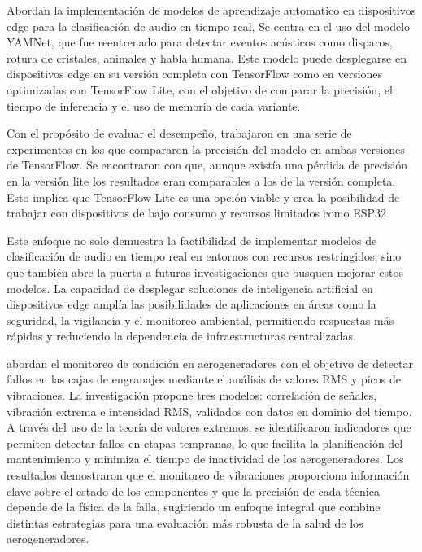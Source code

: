 

\citeauthor{malmberg_real-time_2021} \citeyear{malmberg_real-time_2021} Abordan la implementación de modelos de aprendizaje automatico en dispositivos edge para la clasificación de audio en tiempo real, Se centra en el uso del modelo YAMNet, que fue reentrenado para detectar eventos acústicos como disparos, rotura de cristales, animales y habla humana. Este modelo puede desplegarse en dispositivos edge en su versión completa con TensorFlow como en versiones optimizadas con TensorFlow Lite, con el objetivo de comparar la precisión, el tiempo de inferencia y el uso de memoria de cada variante.

Con el propósito de evaluar el desempeño, trabajaron en una serie de experimentos en los que compararon la precisión del modelo en ambas versiones de TensorFlow. Se encontraron con que, aunque existía una pérdida de precisión en la versión lite los resultados eran comparables a los de la versión completa. Esto implica que TensorFlow Lite es una opción viable y crea la posibilidad de trabajar con dispositivos de bajo consumo y recursos limitados como ESP32

Este enfoque no solo demuestra la factibilidad de implementar modelos de clasificación de audio en tiempo real en entornos con recursos restringidos, sino que también abre la puerta a futuras investigaciones que busquen mejorar estos modelos. La capacidad de desplegar soluciones de inteligencia artificial en dispositivos edge amplía las posibilidades de aplicaciones en áreas como la seguridad, la vigilancia y el monitoreo ambiental, permitiendo respuestas más rápidas y reduciendo la dependencia de infraestructuras centralizadas.


\citeauthor{igba_analysing_2016} \citeyear{igba_analysing_2016} abordan el monitoreo de condición en aerogeneradores con el objetivo de detectar fallos en las cajas de engranajes mediante el análisis de valores RMS y picos de vibraciones. La investigación propone tres modelos: correlación de señales, vibración extrema e intensidad RMS, validados con datos en dominio del tiempo. A través del uso de la teoría de valores extremos, se identificaron indicadores que permiten detectar fallos en etapas tempranas, lo que facilita la planificación del mantenimiento y minimiza el tiempo de inactividad de los aerogeneradores. Los resultados demostraron que el monitoreo de vibraciones proporciona información clave sobre el estado de los componentes y que la precisión de cada técnica depende de la física de la falla, sugiriendo un enfoque integral que combine distintas estrategias para una evaluación más robusta de la salud de los aerogeneradores.


